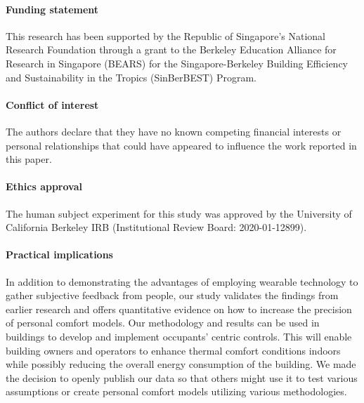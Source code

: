 \documentclass{article}
\begin{document}
    \paragraph{Funding statement} This research has been supported by the Republic of Singapore's National Research Foundation through a grant to the Berkeley Education Alliance for Research in Singapore (BEARS) for the Singapore-Berkeley Building Efficiency and Sustainability in the Tropics (SinBerBEST) Program.

    \paragraph{Conflict of interest} The authors declare that they have no known competing financial interests or personal relationships that could have appeared to influence the work reported in this paper.

    \paragraph{Ethics approval} The human subject experiment for this study was approved by the University of California Berkeley IRB (Institutional Review Board: 2020-01-12899).

    \paragraph{Practical implications} In addition to demonstrating the advantages of employing wearable technology to gather subjective feedback from people, our study validates the findings from earlier research and offers quantitative evidence on how to increase the precision of personal comfort models.
    Our methodology and results can be used in buildings to develop and implement occupants' centric controls.
    This will enable building owners and operators to enhance thermal comfort conditions indoors while possibly reducing the overall energy consumption of the building.
    We made the decision to openly publish our data so that others might use it to test various assumptions or create personal comfort models utilizing various methodologies.

    \clearpage

    

    \linenumbers

    \doublespacing

    

    

    

    

    

    \singlespacing

    \printbibliography

    \clearpage

\end{document}
